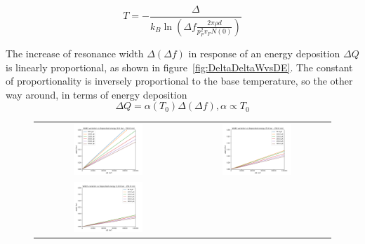 \documentclass[a4paper,10pt]{article}
\begin{document}
\begin{equation}
T = - \frac{\Delta}{k_B \ln \left( \Delta f \frac{2 \pi \rho d}{p_F^2 v_F N(0)} \right)}
\end{equation}

The increase of resonance width $\Delta (\Delta f)$ in response of an energy deposition $\Delta Q$ is linearly proportional, as shown in figure~\ref{fig:DeltaDeltaWvsDE}.
The constant of proportionality is inversely proportional to the base temperature, so the other way around, in terms of energy deposition
\begin{equation}
  \Delta Q = \alpha(T_0) \Delta (\Delta f), \alpha \propto T_0
\end{equation}

\begin{figure}[!ht]
  \begin{center}
  \begin{tabular}{cc}
    \includegraphics[width=0.49\textwidth]{DeltaDeltaW_vs_DE-0bar}  &
    \includegraphics[width=0.49\textwidth]{DeltaDeltaW_vs_DE-5bar}  \\
    \includegraphics[width=0.49\textwidth]{DeltaDeltaW_vs_DE-10bar} &

\end{tabular}
\end{center}
\end{figure}
\end{document}
